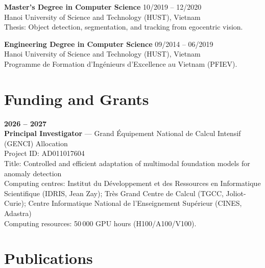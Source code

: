 \documentclass[11pt,a4paper]{article}
\newcommand{\entry}[4]{%
  \textbf{#1} \hfill #2\\
  #3\\
  #4
}
\begin{document}
\entry
{Master's Degree in Computer Science}
{10/2019 -- 12/2020}
{Hanoi University of Science and Technology (HUST), Vietnam}
{Thesis: Object detection, segmentation, and tracking from egocentric vision.
}

\entry
{Engineering Degree in Computer Science}
{09/2014 -- 06/2019}
{Hanoi University of Science and Technology (HUST), Vietnam}
{Programme de Formation d’Ingénieurs d’Excellence au Vietnam (PFIEV).}

\section{Funding and Grants}

\textbf{2026 -- 2027}\\
\textbf{Principal Investigator} — Grand Équipement National de Calcul Intensif (GENCI) Allocation\\
Project ID: AD011017604\\
Title: Controlled and efficient adaptation of multimodal foundation models for anomaly detection\\
Computing centres: Institut du Développement et des Ressources en Informatique Scientifique (IDRIS, Jean Zay);
Très Grand Centre de Calcul (TGCC, Joliot-Curie);
Centre Informatique National de l’Enseignement Supérieur (CINES, Adastra)\\
Computing resources: 50\,000 GPU hours (H100/A100/V100).

\section{Publications}
\end{document}
